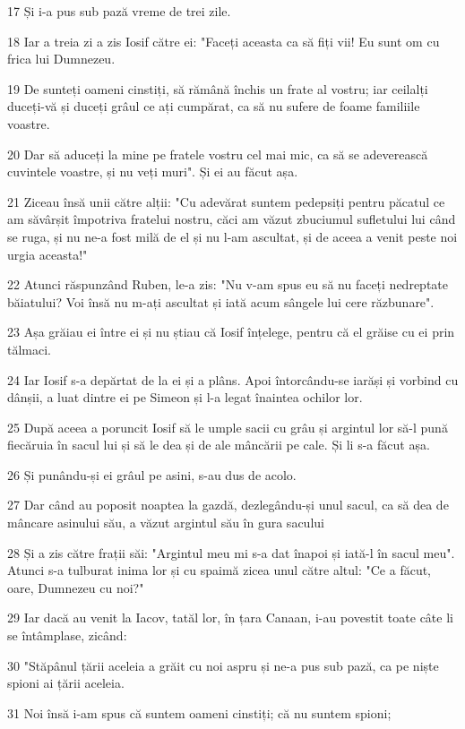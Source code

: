 \par 17 Și i-a pus sub pază vreme de trei zile.
\par 18 Iar a treia zi a zis Iosif către ei: "Faceți aceasta ca să fiți vii! Eu sunt om cu frica lui Dumnezeu.
\par 19 De sunteți oameni cinstiți, să rămână închis un frate al vostru; iar ceilalți duceți-vă și duceți grâul ce ați cumpărat, ca să nu sufere de foame familiile voastre.
\par 20 Dar să aduceți la mine pe fratele vostru cel mai mic, ca să se adeverească cuvintele voastre, și nu veți muri". Și ei au făcut așa.
\par 21 Ziceau însă unii către alții: "Cu adevărat suntem pedepsiți pentru păcatul ce am săvârșit împotriva fratelui nostru, căci am văzut zbuciumul sufletului lui când se ruga, și nu ne-a fost milă de el și nu l-am ascultat, și de aceea a venit peste noi urgia aceasta!"
\par 22 Atunci răspunzând Ruben, le-a zis: "Nu v-am spus eu să nu faceți nedreptate băiatului? Voi însă nu m-ați ascultat și iată acum sângele lui cere răzbunare".
\par 23 Așa grăiau ei între ei și nu știau că Iosif înțelege, pentru că el grăise cu ei prin tălmaci.
\par 24 Iar Iosif s-a depărtat de la ei și a plâns. Apoi întorcându-se iarăși și vorbind cu dânșii, a luat dintre ei pe Simeon și l-a legat înaintea ochilor lor.
\par 25 După aceea a poruncit Iosif să le umple sacii cu grâu și argintul lor să-l pună fiecăruia în sacul lui și să le dea și de ale mâncării pe cale. Și li s-a făcut așa.
\par 26 Și punându-și ei grâul pe asini, s-au dus de acolo.
\par 27 Dar când au poposit noaptea la gazdă, dezlegându-și unul sacul, ca să dea de mâncare asinului său, a văzut argintul său în gura sacului
\par 28 Și a zis către frații săi: "Argintul meu mi s-a dat înapoi și iată-l în sacul meu". Atunci s-a tulburat inima lor și cu spaimă zicea unul către altul: "Ce a făcut, oare, Dumnezeu cu noi?"
\par 29 Iar dacă au venit la Iacov, tatăl lor, în țara Canaan, i-au povestit toate câte li se întâmplase, zicând:
\par 30 "Stăpânul țării aceleia a grăit cu noi aspru și ne-a pus sub pază, ca pe niște spioni ai țării aceleia.
\par 31 Noi însă i-am spus că suntem oameni cinstiți; că nu suntem spioni;
